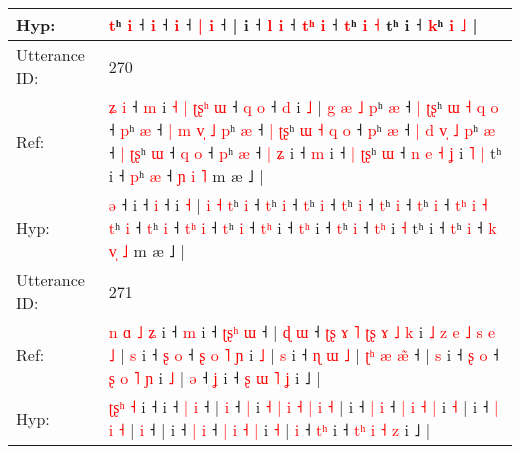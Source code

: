 \documentclass[10pt]{article}
\DeclareRobustCommand{\hl}[1]{{\textcolor{red}{#1}}}
\begin{document}
\begin{longtable}{ll}
Hyp: & \hl{}\hl{t}ʰ \hl{i} ˧\hl{}\hl{}\hl{} \hl{i} ˧\hl{}\hl{}\hl{}\hl{} \hl{i} ˧ \hl{|} \hl{i} ˧ |\hl{}\hl{}\hl{} i ˧ \hl{}\hl{l} \hl{i} ˧ \hl{}\hl{t}\hl{ʰ} \hl{i} ˧\hl{}\hl{}\hl{}\hl{}\hl{}\hl{} \hl{}\hl{t}ʰ\hl{}\hl{}\hl{}\hl{}\hl{}\hl{}\hl{}\hl{} \hl{i} \hl{˧} tʰ i ˧ \hl{k}ʰ \hl{i} \hl{˩} |
 \\
\midrule
Utterance ID: & 270 \\
Ref: & \hl{ʑ}\hl{ }\hl{i} ˧\hl{ }\hl{m} i\hl{ }\hl{˧}\hl{ }\hl{|}\hl{ }\hl{ʈ}\hl{ʂ}\hl{ʰ}\hl{ }\hl{ɯ} ˧\hl{ }\hl{q} \hl{o} ˧\hl{ }\hl{d} i \hl{˩} |\hl{ }\hl{g} \hl{æ} \hl{˩} \hl{p}ʰ \hl{æ} ˧\hl{ }\hl{|} \hl{ʈ}\hl{ʂ}ʰ\hl{ }\hl{ɯ}\hl{ }\hl{˧}\hl{ }\hl{q} \hl{o} ˧ \hl{p}ʰ \hl{æ} ˧\hl{ }\hl{|}\hl{ }\hl{m}\hl{ }\hl{v}\hl{̩}\hl{ }\hl{˩} \hl{p}ʰ \hl{æ} ˧\hl{ }\hl{|} \hl{ʈ}\hl{ʂ}ʰ\hl{ }\hl{ɯ}\hl{ }\hl{˧}\hl{ }\hl{q} \hl{o} ˧ \hl{p}ʰ \hl{æ} ˧ \hl{|}\hl{ }\hl{d} \hl{v}\hl{̩} \hl{˩} \hl{p}ʰ \hl{æ} ˧\hl{ }\hl{|} \hl{ʈ}\hl{ʂ}ʰ \hl{ɯ} ˧ \hl{}\hl{q} \hl{o} ˧ \hl{p}ʰ \hl{æ} ˧ \hl{|}\hl{ }\hl{ʑ} i ˧ \hl{}\hl{m} i ˧\hl{ }\hl{|} \hl{ʈ}\hl{ʂ}ʰ \hl{ɯ} ˧\hl{ }\hl{n}\hl{ }\hl{e} \hl{˧}\hl{ }\hl{ʝ} i\hl{ }\hl{˥} \hl{|} tʰ i ˧ \hl{p}ʰ \hl{æ} ˧ \hl{ɲ} \hl{}\hl{i} \hl{˥} m æ ˩ |
 \\
Hyp: & \hl{}\hl{}\hl{ə} ˧\hl{}\hl{} i\hl{}\hl{}\hl{}\hl{}\hl{}\hl{}\hl{}\hl{}\hl{}\hl{} ˧\hl{}\hl{} \hl{i} ˧\hl{}\hl{} i \hl{˧} |\hl{}\hl{} \hl{i} \hl{˧} \hl{t}ʰ \hl{i} ˧\hl{}\hl{} \hl{}\hl{t}ʰ\hl{}\hl{}\hl{}\hl{}\hl{}\hl{} \hl{i} ˧ \hl{t}ʰ \hl{i} ˧\hl{}\hl{}\hl{}\hl{}\hl{}\hl{}\hl{}\hl{}\hl{} \hl{t}ʰ \hl{i} ˧\hl{}\hl{} \hl{}\hl{t}ʰ\hl{}\hl{}\hl{}\hl{}\hl{}\hl{} \hl{i} ˧ \hl{t}ʰ \hl{i} ˧ \hl{}\hl{t}\hl{ʰ} \hl{}\hl{i} \hl{˧} \hl{t}ʰ \hl{i} ˧\hl{}\hl{} \hl{}\hl{t}ʰ \hl{i} ˧ \hl{t}\hl{ʰ} \hl{i} ˧ \hl{t}ʰ \hl{i} ˧ \hl{}\hl{t}\hl{ʰ} i ˧ \hl{t}\hl{ʰ} i ˧\hl{}\hl{} \hl{}\hl{t}ʰ \hl{i} ˧\hl{}\hl{}\hl{}\hl{} \hl{}\hl{t}\hl{ʰ} i\hl{}\hl{} \hl{˧} tʰ i ˧ \hl{t}ʰ \hl{i} ˧ \hl{k} \hl{v}\hl{̩} \hl{˩} m æ ˩ |
 \\
\midrule
Utterance ID: & 271 \\
Ref: & \hl{n}\hl{ }\hl{ɑ}\hl{ }\hl{˩} \hl{ʑ} i ˧\hl{ }\hl{m} i ˧ \hl{ʈ}\hl{ʂ}\hl{ʰ} \hl{ɯ} ˧ |\hl{ }\hl{ɖ} \hl{ɯ} ˧\hl{ }\hl{ʈ}\hl{ʂ}\hl{ }\hl{ɤ}\hl{ }\hl{˥}\hl{ }\hl{ʈ}\hl{ʂ}\hl{ }\hl{ɤ}\hl{ }\hl{˩} \hl{k} i \hl{˩} \hl{z} \hl{e} \hl{˩} \hl{s} \hl{e} \hl{˩} |\hl{ }\hl{s} i ˧ \hl{ʂ} \hl{o} ˧ \hl{ʂ} \hl{o} \hl{˥} \hl{ɲ} i \hl{˩} |\hl{ }\hl{s} i ˧ \hl{ɳ} \hl{ɯ} \hl{˩} |\hl{ }\hl{ʈ}\hl{ʰ}\hl{ }\hl{æ} \hl{æ}\hl{̃} ˧ |\hl{ }\hl{s} i ˧ \hl{ʂ} \hl{o} ˧ \hl{ʂ} \hl{o} \hl{˥} \hl{ɲ} i \hl{˩} | \hl{ə} ˧ \hl{}\hl{ʝ} i ˧ \hl{}\hl{ʂ} \hl{ɯ} \hl{˥} \hl{ʝ} i ˩ |
 \\
Hyp: & \hl{}\hl{}\hl{ʈ}\hl{ʂ}\hl{ʰ} \hl{˧} i ˧\hl{}\hl{} i ˧ \hl{}\hl{}\hl{|} \hl{i} ˧ |\hl{}\hl{} \hl{i} ˧\hl{}\hl{}\hl{}\hl{}\hl{}\hl{}\hl{}\hl{}\hl{}\hl{}\hl{}\hl{}\hl{}\hl{} \hl{|} i \hl{˧} \hl{|} \hl{i} \hl{˧} \hl{|} \hl{i} \hl{˧} |\hl{}\hl{} i ˧ \hl{|} \hl{i} ˧ \hl{|} \hl{i} \hl{˧} \hl{|} i \hl{˧} |\hl{}\hl{} i ˧ \hl{|} \hl{i} \hl{˧} |\hl{}\hl{}\hl{}\hl{}\hl{} \hl{}\hl{i} ˧ |\hl{}\hl{} i ˧ \hl{|} \hl{i} ˧ \hl{|} \hl{i} \hl{˧} \hl{|} i \hl{˧} | \hl{i} ˧ \hl{t}\hl{ʰ} i ˧ \hl{t}\hl{ʰ} \hl{i} \hl{˧} \hl{z} i ˩ |
 \\
\midrule
\end{longtable}
\end{document}

